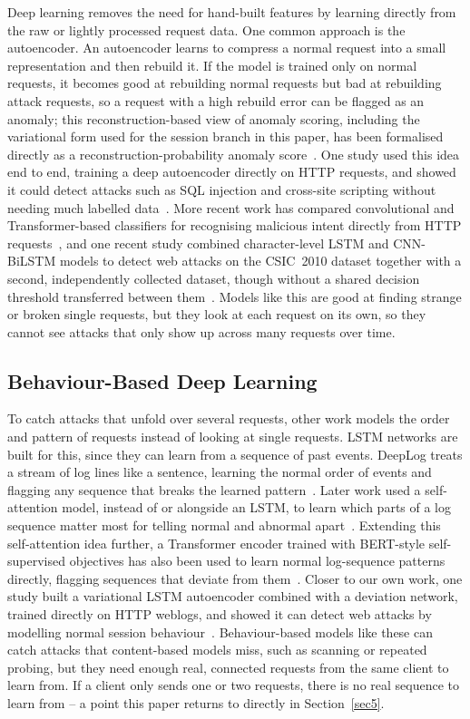 \documentclass[futureinternet,article,submit,moreauthors]{Definitions/mdpi}
\begin{document}
Deep learning removes the need for hand-built features by learning directly from the raw or lightly processed request data. One common approach is the autoencoder. An autoencoder learns to compress a normal request into a small representation and then rebuild it. If the model is trained only on normal requests, it becomes good at rebuilding normal requests but bad at rebuilding attack requests, so a request with a high rebuild error can be flagged as an anomaly; this reconstruction-based view of anomaly scoring, including the variational form used for the session branch in this paper, has been formalised directly as a reconstruction-probability anomaly score~\cite{ancho2015}. One study used this idea end to end, training a deep autoencoder directly on HTTP requests, and showed it could detect attacks such as SQL injection and cross-site scripting without needing much labelled data~\cite{pan2019}. More recent work has compared convolutional and Transformer-based classifiers for recognising malicious intent directly from HTTP requests~\cite{tiwari2024}, and one recent study combined character-level LSTM and CNN-BiLSTM models to detect web attacks on the CSIC~2010 dataset together with a second, independently collected dataset, though without a shared decision threshold transferred between them~\cite{zhou2025}. Models like this are good at finding strange or broken single requests, but they look at each request on its own, so they cannot see attacks that only show up across many requests over time.

\subsection{Behaviour-Based Deep Learning}

To catch attacks that unfold over several requests, other work models the order and pattern of requests instead of looking at single requests. LSTM networks are built for this, since they can learn from a sequence of past events. DeepLog treats a stream of log lines like a sentence, learning the normal order of events and flagging any sequence that breaks the learned pattern~\cite{du2017}. Later work used a self-attention model, instead of or alongside an LSTM, to learn which parts of a log sequence matter most for telling normal and abnormal apart~\cite{nedelkoski2020}. Extending this self-attention idea further, a Transformer encoder trained with BERT-style self-supervised objectives has also been used to learn normal log-sequence patterns directly, flagging sequences that deviate from them~\cite{guo2021}. Closer to our own work, one study built a variational LSTM autoencoder combined with a deviation network, trained directly on HTTP weblogs, and showed it can detect web attacks by modelling normal session behaviour~\cite{jagat2024}. Behaviour-based models like these can catch attacks that content-based models miss, such as scanning or repeated probing, but they need enough real, connected requests from the same client to learn from. If a client only sends one or two requests, there is no real sequence to learn from -- a point this paper returns to directly in Section~\ref{sec5}.
\end{document}

